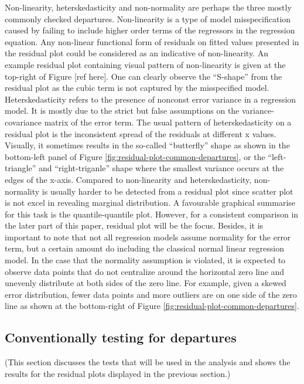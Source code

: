 \documentclass[]{interact}
\theoremstyle{plain}%
\theoremstyle{definition}
\theoremstyle{remark}
\begin{document}
Non-linearity, heterskedasticity and non-normality are perhaps the three
mostly commonly checked departures. Non-linearity is a type of model
misspecification caused by failing to include higher order terms of the
regressors in the regression equation. Any non-linear functional form of
residuals on fitted values presented in the residual plot could be
considered as an indicative of non-linearity. An example residual plot
containing visual pattern of non-linearity is given at the top-right of
Figure {[}ref here{]}. One can clearly observe the ``S-shape'' from the
residual plot as the cubic term is not captured by the misspecified
model. Heterskedasticity refers to the presence of nonconst error
variance in a regression model. It is mostly due to the strict but false
assumptions on the variance-covariance matrix of the error term. The
usual pattern of heterskedasticity on a residual plot is the
inconsistent spread of the residuals at different x values. Visually, it
sometimes results in the so-called ``butterfly'' shape as shown in the
bottom-left panel of Figure \ref{fig:residual-plot-common-departures},
or the ``left-triangle'' and ``right-triganle'' shape where the smallest
variance occurs at the edges of the x-axis. Compared to non-linearity
and heterskedasticity, non-normality is usually harder to be detected
from a residual plot since scatter plot is not excel in revealing
marginal distribution. A favourable graphical summarise for this task is
the quantile-quantile plot. However, for a consistent comparison in the
later part of this paper, residual plot will be the focus. Besides, it
is important to note that not all regression models assume normality for
the error term, but a certain amount do including the classical normal
linear regression model. In the case that the normality assumption is
violated, it is expected to observe data points that do not centralize
around the horizontal zero line and unevenly distribute at both sides of
the zero line. For example, given a skewed error distribution, fewer
data points and more outliers are on one side of the zero line as shown
at the bottom-right of Figure \ref{fig:residual-plot-common-departures}.

\hypertarget{conventionally-testing-for-departures}{%
\subsection{Conventionally testing for
departures}\label{conventionally-testing-for-departures}}

(This section discusses the tests that will be used in the analysis and
shows the results for the residual plots displayed in the previous
section.)
\end{document}

